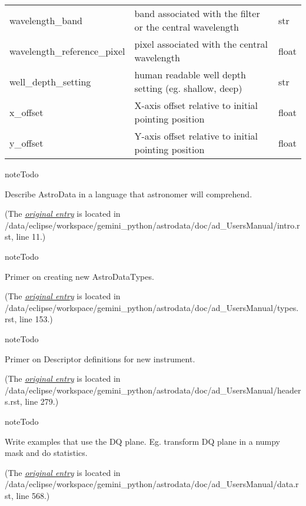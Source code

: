 \documentclass[letterpaper,10pt,english]{sphinxmanual}
\begin{document}
\begin{longtable}{|l|l|l|}
wavelength\_band
 & 
band associated with the filter or the central wavelength
 & 
str
\\

wavelength\_reference\_pixel
 & 
pixel associated with the central wavelength
 & 
float
\\

well\_depth\_setting
 & 
human readable well depth setting (eg. shallow, deep)
 & 
str
\\

x\_offset
 & 
X-axis offset relative to initial pointing position
 & 
float
\\

y\_offset
 & 
Y-axis offset relative to initial pointing position
 & 
float
\\
\hline\end{longtable}


\begin{notice}{note}{Todo}

Describe AstroData in a language that astronomer will comprehend.
\end{notice}

(The {\hyperref[intro:index-0]{\emph{original entry}}} is located in  /data/eclipse/workspace/gemini\_python/astrodata/doc/ad\_UsersManual/intro.rst, line 11.)

\begin{notice}{note}{Todo}

Primer on creating new AstroDataTypes.
\end{notice}

(The {\hyperref[types:index-0]{\emph{original entry}}} is located in  /data/eclipse/workspace/gemini\_python/astrodata/doc/ad\_UsersManual/types.rst, line 153.)

\begin{notice}{note}{Todo}

Primer on Descriptor definitions for new instrument.
\end{notice}

(The {\hyperref[headers:index-0]{\emph{original entry}}} is located in  /data/eclipse/workspace/gemini\_python/astrodata/doc/ad\_UsersManual/headers.rst, line 279.)

\begin{notice}{note}{Todo}

Write examples that use the DQ plane.  Eg. transform DQ plane in a numpy
mask and do statistics.
\end{notice}

(The {\hyperref[data:index-0]{\emph{original entry}}} is located in  /data/eclipse/workspace/gemini\_python/astrodata/doc/ad\_UsersManual/data.rst, line 568.)



\renewcommand{\indexname}{Index}
\printindex
\end{document}
